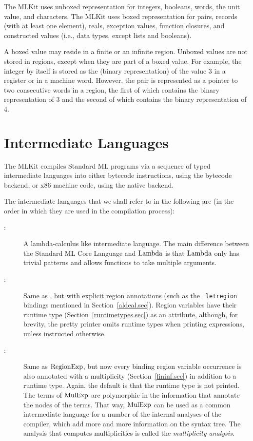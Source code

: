 \documentclass[12pt]{book}
\begin{document}
The MLKit uses unboxed representation for integers, booleans, words, the
unit value, and characters.  The MLKit uses boxed representation for
pairs, records (with at least one element), reals, exception values,
function closures, and constructed values (i.e., data types, except
lists and booleans).

A boxed value may reside in a finite or an infinite region.  Unboxed
values are not stored in regions, except when they are part of a boxed
value. For example, the integer  by itself is stored as the
(binary representation) of the value 3 in a register or in a machine
word. However, the pair  is represented as a pointer to
two consecutive words in a region, the first of which contains the
binary representation of 3 and the second of which contains the binary
representation of 4.

\section{Intermediate Languages}
The MLKit compiles Standard ML programs via a sequence of typed
intermediate languages into either bytecode instructions, using the
bytecode backend, or x86 machine code, using the native backend.

The intermediate languages that we shall refer to in the following are
(in the order in which they are used in the compilation process):
\begin{description}
\item[\Lam:] 
  A lambda-calculus like intermediate language. The main difference
  between the Standard ML Core Language and $\hbox{\rm Lambda}$ is that $\hbox{\rm Lambda}$ only
  has trivial patterns and allows functions to take 
%
%
%
  multiple arguments.
\item[\RegExp:] 
  Same as \Lam, but with explicit region annotations (such as the {\tt
    letregion} bindings mentioned in Section~\ref{aldeal.sec}). Region
  variables have their runtime type (Section~\ref{runtimetypes.sec})
  as an attribute, although, for brevity, the pretty printer omits
  runtime types when printing expressions, unless instructed
  otherwise.
\item[\MulExp:] 
  Same as $\hbox{\rm RegionExp}$, but now every binding region variable occurrence
  is also annotated with a multiplicity (Section~\ref{fininf.sec}) in
  addition to a runtime type.  Again, the default is that the runtime
  type is not printed.  The terms of $\hbox{\rm MulExp}$ are polymorphic in the
  information that annotate the nodes of the terms. That way,
  $\hbox{\rm MulExp}$ can be used as a common intermediate language for a number
  of the internal analyses of the compiler, which add more and more
  information on the syntax tree.  The analysis that computes
  multiplicities is called the
  {\em multiplicity analysis}.
\end{description}
\end{document}
